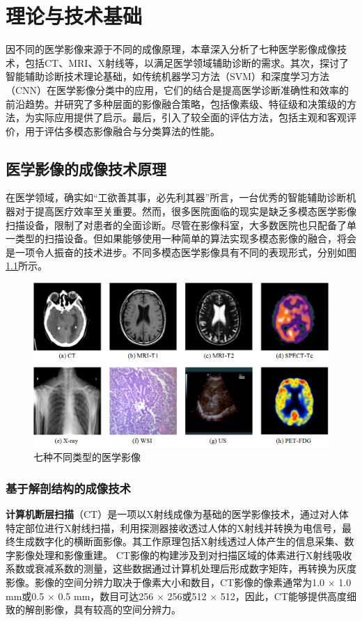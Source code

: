 \chapter{理论与技术基础} 
\label{chapter:Basis}
因不同的医学影像来源于不同的成像原理，本章深入分析了七种医学影像成像技术，包括CT、MRI、X射线等，以满足医学领域辅助诊断的需求。其次，探讨了智能辅助诊断技术理论基础，如传统机器学习方法（SVM）和深度学习方法（CNN）在医学影像分类中的应用，它们的结合是提高医学诊断准确性和效率的前沿趋势。并研究了多种层面的影像融合策略，包括像素级、特征级和决策级的方法，为实际应用提供了启示。最后，引入了较全面的评估方法，包括主观和客观评价，用于评估多模态影像融合与分类算法的性能。

\section{医学影像的成像技术原理}
在医学领域，确实如“工欲善其事，必先利其器”所言，一台优秀的智能辅助诊断机器对于提高医疗效率至关重要。然而，很多医院面临的现实是缺乏多模态医学影像扫描设备，限制了对患者的全面诊断。尽管在影像科室，大多数医院也只配备了单一类型的扫描设备。但如果能够使用一种简单的算法实现多模态影像的融合，将会是一项令人振奋的技术进步。不同多模态医学影像具有不同的表现形式，分别如图\ref{mul_imaging}所示。

   \begin{figure}[htbp]
      \centering  
      \includegraphics[width=0.9\linewidth]{figs/mul_imaging.png}
      \caption{七种不同类型的医学影像}\label{mul_imaging}
    \end{figure}

\subsection{基于解剖结构的成像技术}
\textbf{计算机断层扫描}（CT）\cite{boyd1983cardiac}是一项以X射线成像为基础的医学影像技术，通过对人体特定部位进行X射线扫描，利用探测器接收透过人体的X射线并转换为电信号，最终生成数字化的横断面影像。其工作原理包括X射线透过人体产生的信息采集、数字影像处理和影像重建。
CT影像的构建涉及到对扫描区域的体素进行X射线吸收系数或衰减系数的测量，这些数据通过计算机处理后形成数字矩阵，再转换为灰度影像。影像的空间分辨力取决于像素大小和数目，CT影像的像素通常为1.0 × 1.0 mm或0.5 × 0.5 mm，数目可达256 × 256或512 × 512，因此，CT能够提供高度细致的解剖影像，具有较高的空间分辨力。

